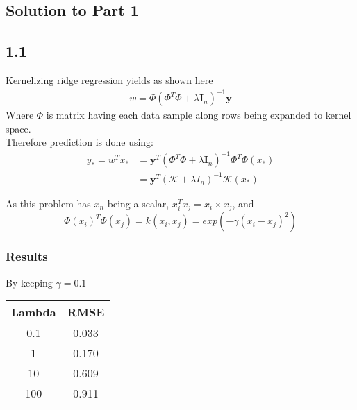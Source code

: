 \documentclass[a4paper,11pt]{article}
\begin{document}
\begin{mlsolution}

\section*{Solution to Part 1}
\subsection*{1.1}
Kernelizing ridge regression yields as shown \href{https://web2.qatar.cmu.edu/~gdicaro/10315-Fall19/additional/welling-notes-on-kernel-ridge.pdf}{here}
\begin{align}
    w = \Phi (\Phi^T\Phi + \lambda \textbf{I}_n)^{-1}\textbf{y}
\end{align}
Where $\Phi$ is matrix having each data sample along rows being expanded to kernel space. \\
Therefore prediction is done using:
\begin{align}
    y_* = w^T x_* &= \textbf{y}^T (\Phi^T\Phi + \lambda
    \textbf{I}_n)^{-1} \Phi^T \Phi(x_*) \\
    &= \textbf{y}^T (\mathcal{K} + \lambda I_n)^{-1} \mathcal{K}(x_*)
\end{align}

As this problem has $x_n$ being a scalar, $x_i^Tx_j = x_i\times x_j$, and $$\Phi(x_i)^T \Phi(x_j) = k(x_i, x_j) = exp(-\gamma (x_i - x_j)^2)$$

\subsubsection*{Results}
By keeping $\gamma = 0.1$
\begin{center}
    \begin{tabular}[pos]{|c|c|}
        \hline
        Lambda & RMSE \\
        \hline
        0.1  & 0.033 \\
        1    & 0.170 \\
        10   & 0.609 \\
        100  & 0.911 \\
        \hline
    \end{tabular}
\end{center}

\begin{figure}[H]
    \centering
    

\end{figure}
\end{mlsolution}
\end{document}
